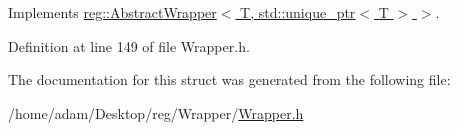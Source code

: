 Implements \hyperlink{structreg_1_1_abstract_wrapper_af017f2af039fd5b940345e930e4bb397}{reg\+::\+Abstract\+Wrapper$<$ T, std\+::unique\+\_\+ptr$<$ T $>$ $>$}.



Definition at line 149 of file Wrapper.\+h.



The documentation for this struct was generated from the following file\+:\begin{DoxyCompactItemize}
\item 
/home/adam/\+Desktop/reg/\+Wrapper/\hyperlink{_wrapper_8h}{Wrapper.\+h}\end{DoxyCompactItemize}
